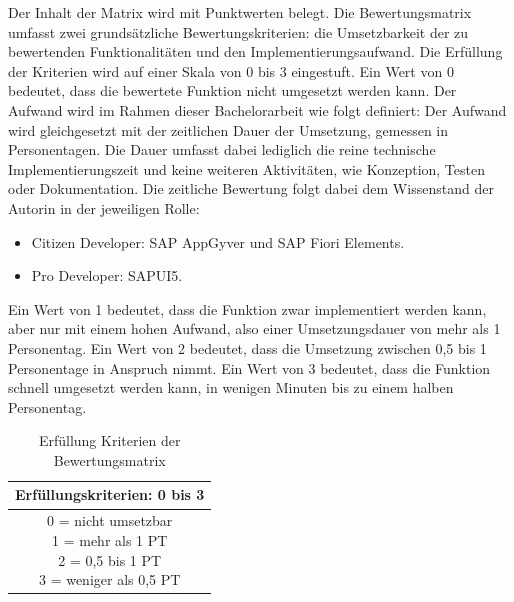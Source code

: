 Der Inhalt der Matrix wird mit Punktwerten belegt. Die Bewertungsmatrix umfasst zwei grundsätzliche Bewertungskriterien: die Umsetzbarkeit der zu bewertenden Funktionalitäten und den Implementierungsaufwand. Die Erfüllung der Kriterien wird auf einer Skala von 0 bis 3 eingestuft. Ein Wert von 0 bedeutet, dass die bewertete Funktion nicht umgesetzt werden kann. Der Aufwand wird im Rahmen dieser Bachelorarbeit wie folgt definiert: Der Aufwand wird gleichgesetzt mit der zeitlichen Dauer der Umsetzung, gemessen in Personentagen. Die Dauer umfasst dabei lediglich die reine technische Implementierungszeit und keine weiteren Aktivitäten, wie Konzeption, Testen oder Dokumentation. Die zeitliche Bewertung folgt dabei dem Wissenstand der Autorin in der jeweiligen Rolle:

\begin{itemize}[noitemsep]
\item Citizen Developer: SAP AppGyver und SAP Fiori Elements.
\item Pro Developer: SAPUI5.
\end{itemize}

Ein Wert von 1 bedeutet, dass die Funktion zwar implementiert werden kann, aber nur mit einem hohen Aufwand, also einer Umsetzungsdauer von mehr als 1 Personentag. Ein Wert von 2 bedeutet, dass die Umsetzung zwischen 0,5 bis 1 Personentage in Anspruch nimmt. Ein Wert von 3 bedeutet, dass die Funktion schnell umgesetzt werden kann, in wenigen Minuten bis zu einem halben Personentag.

\begin{table}[htbp]
    \centering
    \begin{tabular}{| c |}
        \hline
        \rowcolor{mygrey2} Erfüllungskriterien: 0 bis 3  \\
        \hline
        \makecell[l]{0 = nicht umsetzbar \\ 1 = mehr als 1 PT \\ 2 = 0,5 bis 1 PT \\ 3 = weniger als 0,5 PT}  \\
        \hline
    \end{tabular}
 \caption{Erfüllung Kriterien der Bewertungsmatrix} 
\end{table}


 \pagebreak
